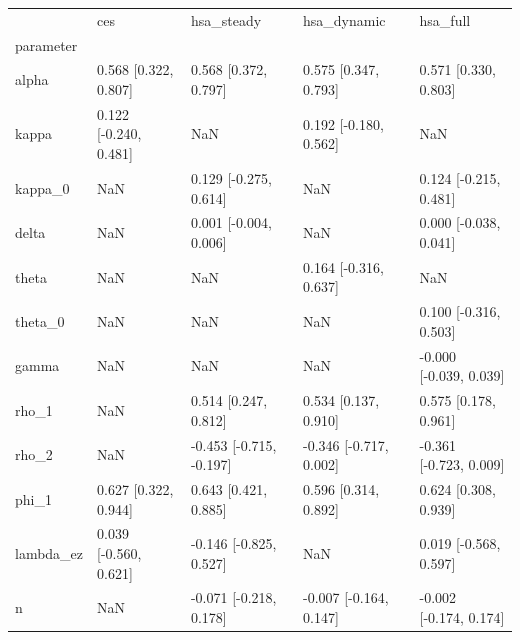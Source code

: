 \begin{tabular}{lllll}
\toprule
 & ces & hsa\_steady & hsa\_dynamic & hsa\_full \\
parameter &  &  &  &  \\
\midrule
alpha & 0.568 [0.322, 0.807] & 0.568 [0.372, 0.797] & 0.575 [0.347, 0.793] & 0.571 [0.330, 0.803] \\
kappa & 0.122 [-0.240, 0.481] & NaN & 0.192 [-0.180, 0.562] & NaN \\
kappa\_0 & NaN & 0.129 [-0.275, 0.614] & NaN & 0.124 [-0.215, 0.481] \\
delta & NaN & 0.001 [-0.004, 0.006] & NaN & 0.000 [-0.038, 0.041] \\
theta & NaN & NaN & 0.164 [-0.316, 0.637] & NaN \\
theta\_0 & NaN & NaN & NaN & 0.100 [-0.316, 0.503] \\
gamma & NaN & NaN & NaN & -0.000 [-0.039, 0.039] \\
rho\_1 & NaN & 0.514 [0.247, 0.812] & 0.534 [0.137, 0.910] & 0.575 [0.178, 0.961] \\
rho\_2 & NaN & -0.453 [-0.715, -0.197] & -0.346 [-0.717, 0.002] & -0.361 [-0.723, 0.009] \\
phi\_1 & 0.627 [0.322, 0.944] & 0.643 [0.421, 0.885] & 0.596 [0.314, 0.892] & 0.624 [0.308, 0.939] \\
lambda\_ez & 0.039 [-0.560, 0.621] & -0.146 [-0.825, 0.527] & NaN & 0.019 [-0.568, 0.597] \\
n & NaN & -0.071 [-0.218, 0.178] & -0.007 [-0.164, 0.147] & -0.002 [-0.174, 0.174] \\
\bottomrule
\end{tabular}
